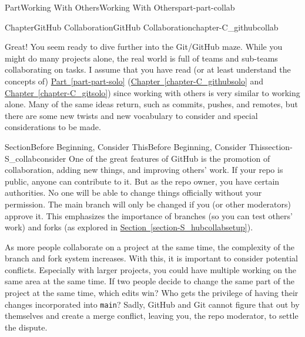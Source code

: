 \documentclass[oneside,10pt,]{book}
\newcommand{\xreffont}{\relax}
\newcommand{\mono}[1]{\texttt{#1}}
\begin{document}
\begin{partptx}{Part}{Working With Others}{}{Working With Others}{}{}{part-part-collab}
\renewcommand*{\partname}{Part}
%
\typeout{************************************************}
\typeout{************************************************}
%
\begin{chapterptx}{Chapter}{GitHub Collaboration}{}{GitHub Collaboration}{}{}{chapter-C_githubcollab}
\renewcommand*{\chaptername}{Chapter}
\begin{introduction}{}%
Great! You seem ready to dive further into the Git\slash{}GitHub maze. While you might do many projects alone, the real world is full of teams and sub-teams collaborating on tasks. I assume that you have read (or at least understand the concepts of) \hyperref[part-part-solo]{Part~{\xreffont\ref{part-part-solo}}} (\hyperref[chapter-C_githubsolo]{Chapter~{\xreffont\ref{chapter-C_githubsolo}}} and \hyperref[chapter-C_gitsolo]{Chapter~{\xreffont\ref{chapter-C_gitsolo}}}) since working with others is very similar to working alone. Many of the same ideas return, such as commits, pushes, and remotes, but there are some new twists and new vocabulary to consider and special considerations to be made.%
\end{introduction}%
%
%
\typeout{************************************************}
\typeout{************************************************}
%
\begin{sectionptx}{Section}{Before Beginning, Consider This}{}{Before Beginning, Consider This}{}{}{section-S_collabconsider}
%
%
One of the great features of GitHub is the promotion of collaboration, adding new things, and improving others' work. If your repo is public, anyone can contribute to it. But as the repo owner, you have certain authorities. No one will be able to change things officially without your permission. The main branch will only be changed if you (or other moderators) approve it. This emphasizes the importance of branches (so you can test others' work) and forks (as explored in \hyperref[section-S_hubcollabsetup]{Section~{\xreffont\ref{section-S_hubcollabsetup}}}).%
\par
As more people collaborate on a project at the same time, the complexity of the branch and fork system increases. With this, it is important to consider potential conflicts. Especially with larger projects, you could have multiple working on the same area at the same time. If two people decide to change the same part of the project at the same time, which edits win? Who gets the privilege of having their changes incorporated into \mono{main}? Sadly, GitHub and Git cannot figure that out by themselves and create a merge conflict, leaving you, the repo moderator, to settle the dispute.%

\end{sectionptx}
\end{chapterptx}
\end{partptx}
\end{document}
